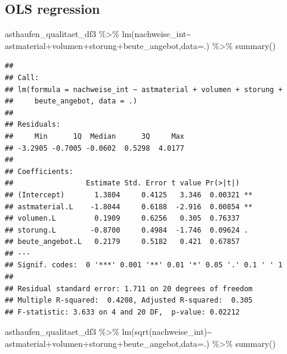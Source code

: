 \documentclass[
  oneside]{scrbook}
\newenvironment{Shaded}{\begin{snugshade}}{\end{snugshade}}
\newcommand{\AttributeTok}[1]{\textcolor[rgb]{0.77,0.63,0.00}{#1}}
\newcommand{\FunctionTok}[1]{\textcolor[rgb]{0.00,0.00,0.00}{#1}}
\newcommand{\NormalTok}[1]{#1}
\newcommand{\SpecialCharTok}[1]{\textcolor[rgb]{0.00,0.00,0.00}{#1}}
\begin{document}
\hypertarget{ols-regression}{%
\subsection{OLS regression}\label{ols-regression}}

\begin{Shaded}
\begin{Highlighting}[]
\NormalTok{asthaufen\_qualitaet\_df3 }\SpecialCharTok{\%\textgreater{}\%} \FunctionTok{lm}\NormalTok{(nachweise\_int}\SpecialCharTok{\textasciitilde{}}
\NormalTok{                   astmaterial}\SpecialCharTok{+}\NormalTok{volumen}\SpecialCharTok{+}\NormalTok{storung}\SpecialCharTok{+}\NormalTok{beute\_angebot,}\AttributeTok{data=}\NormalTok{.) }\SpecialCharTok{\%\textgreater{}\%}
  \FunctionTok{summary}\NormalTok{()}
\end{Highlighting}
\end{Shaded}

\begin{verbatim}
## 
## Call:
## lm(formula = nachweise_int ~ astmaterial + volumen + storung + 
##     beute_angebot, data = .)
## 
## Residuals:
##     Min      1Q  Median      3Q     Max 
## -3.2905 -0.7005 -0.0602  0.5298  4.0177 
## 
## Coefficients:
##                 Estimate Std. Error t value Pr(>|t|)   
## (Intercept)       1.3804     0.4125   3.346  0.00321 **
## astmaterial.L    -1.8044     0.6188  -2.916  0.00854 **
## volumen.L         0.1909     0.6256   0.305  0.76337   
## storung.L        -0.8700     0.4984  -1.746  0.09624 . 
## beute_angebot.L   0.2179     0.5182   0.421  0.67857   
## ---
## Signif. codes:  0 '***' 0.001 '**' 0.01 '*' 0.05 '.' 0.1 ' ' 1
## 
## Residual standard error: 1.711 on 20 degrees of freedom
## Multiple R-squared:  0.4208, Adjusted R-squared:  0.305 
## F-statistic: 3.633 on 4 and 20 DF,  p-value: 0.02212
\end{verbatim}

\begin{Shaded}
\begin{Highlighting}[]
\NormalTok{asthaufen\_qualitaet\_df3 }\SpecialCharTok{\%\textgreater{}\%} \FunctionTok{lm}\NormalTok{(}\FunctionTok{sqrt}\NormalTok{(nachweise\_int)}\SpecialCharTok{\textasciitilde{}}
\NormalTok{             astmaterial}\SpecialCharTok{+}\NormalTok{volumen}\SpecialCharTok{+}\NormalTok{storung}\SpecialCharTok{+}\NormalTok{beute\_angebot,}\AttributeTok{data=}\NormalTok{.) }\SpecialCharTok{\%\textgreater{}\%}
  \FunctionTok{summary}\NormalTok{()}
\end{Highlighting}
\end{Shaded}
\end{document}

